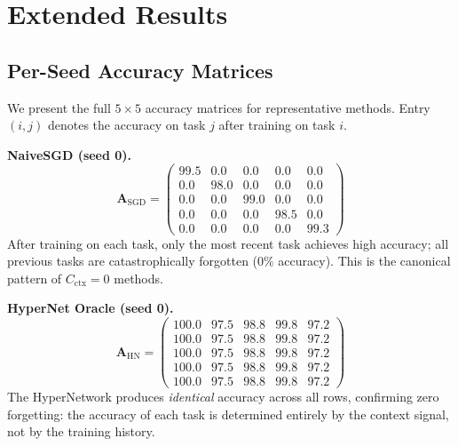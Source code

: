 \documentclass{article}
\begin{document}
\section{Extended Results}
\label{app:extended}

\subsection{Per-Seed Accuracy Matrices}
\label{app:per_seed}

We present the full $5 \times 5$ accuracy matrices for representative methods. Entry $(i, j)$ denotes the accuracy on task $j$ after training on task $i$.

\textbf{NaiveSGD (seed 0).}
\begin{equation*}
\mathbf{A}_\mathrm{SGD} = \begin{pmatrix}
99.5 & 0.0  & 0.0  & 0.0  & 0.0 \\
0.0  & 98.0 & 0.0  & 0.0  & 0.0 \\
0.0  & 0.0  & 99.0 & 0.0  & 0.0 \\
0.0  & 0.0  & 0.0  & 98.5 & 0.0 \\
0.0  & 0.0  & 0.0  & 0.0  & 99.3
\end{pmatrix}
\end{equation*}
After training on each task, only the most recent task achieves high accuracy; all previous tasks are catastrophically forgotten (0\% accuracy). This is the canonical pattern of $C_\mathrm{ctx} = 0$ methods.

\textbf{HyperNet Oracle (seed 0).}
\begin{equation*}
\mathbf{A}_\mathrm{HN} = \begin{pmatrix}
100.0 & 97.5 & 98.8 & 99.8 & 97.2 \\
100.0 & 97.5 & 98.8 & 99.8 & 97.2 \\
100.0 & 97.5 & 98.8 & 99.8 & 97.2 \\
100.0 & 97.5 & 98.8 & 99.8 & 97.2 \\
100.0 & 97.5 & 98.8 & 99.8 & 97.2
\end{pmatrix}
\end{equation*}
The HyperNetwork produces \emph{identical} accuracy across all rows, confirming zero forgetting: the accuracy of each task is determined entirely by the context signal, not by the training history.
\end{document}
